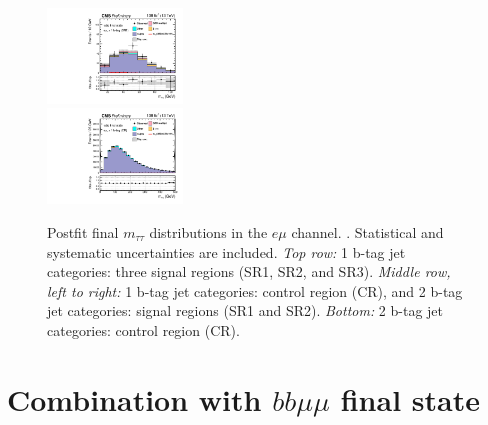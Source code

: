 \begin{figure}[ht]
\begin{center}
        \includegraphics[width=0.32\textwidth]{figures/ch-13-results/em_all_6_post_prelim-yes.pdf}\\
        \includegraphics[width=0.32\textwidth]{figures/ch-13-results/em_all_7_post_prelim-yes.pdf}
    \end{center}
    \caption[Postfit final $m_{\tau\tau}$ distributions in the $e\mu$ channel.]{Postfit final $m_{\tau\tau}$ distributions in the $e\mu$ channel. \cite{CMS-AN-20-213}. Statistical and systematic uncertainties are included. \textit{Top row:} 1 b-tag jet categories: three signal regions (SR1, SR2, and SR3). \textit{Middle row, left to right:} 1 b-tag jet categories: control region (CR), and 2 b-tag jet categories: signal regions (SR1 and SR2). \textit{Bottom:} 2 b-tag jet categories: control region (CR).}
    \label{fig:results_mtt_postfit_emall}
\end{figure}




\section{Combination with $bb\mu\mu$ final state}
